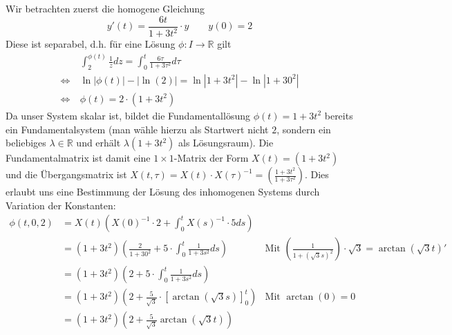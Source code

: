 \documentclass[a4paper]{article}
\begin{document}
Wir betrachten zuerst die homogene Gleichung
\begin{equation*}
    y'(t) = \frac{6t}{1 + 3t^2} \cdot y \qquad y(0) = 2
\end{equation*}
Diese ist separabel, d.h. für eine Lösung $\phi: I \to \mathds{R}$ gilt
\begin{align*}
    & \int_{2}^{\phi(t)} \frac{1}{z} dz = \int_{0}^{t} \frac{6 \tau}{1 + 3 \tau^2} d\tau \\
    \iff \ & \ln|\phi(t)| - |\ln(2)| = \ln|1 + 3 t^2| - \ln|1 + 3 0^2| \\
    \iff \ & \phi(t) = 2 \cdot  (1 + 3 t^2)
\end{align*}
Da unser System skalar ist, bildet die Fundamentallösung $\phi(t) = 1 + 3 t^2$ bereits ein Fundamentalsystem (man wähle hierzu als Startwert nicht $2$, sondern ein beliebiges $\lambda \in \mathds{R}$ und erhält $\lambda (1 + 3t^2)$ als Lösungsraum).
Die Fundamentalmatrix ist damit eine $1 \times 1$-Matrix der Form $X(t) = (1 + 3t^2)$ und die Übergangsmatrix ist $X(t, \tau) = X(t) \cdot X(\tau)^{-1} = \left( \frac{1 + 3t^2}{1 + 3 \tau^2} \right)$.
Dies erlaubt uns eine Bestimmung der Lösung des inhomogenen Systems durch Variation der Konstanten:
\begin{align*}
    \phi(t, 0, 2) &= X(t) \left( X(0)^{-1} \cdot 2 + \int_{0}^{t} X(s)^{-1} \cdot 5 ds \right) \\
    &= (1 + 3t^2) \left( \frac{2}{1 + 30^2} + 5 \cdot \int_{0}^{t} \frac{1}{1 + 3s^2} ds \right)  & \text{Mit } (\frac{1}{1 + (\sqrt{3} s)^2}) \cdot \sqrt{3} = \arctan(\sqrt{3} t)'\\
    &= (1 + 3t^2) \left( 2 + 5 \cdot \int_{0}^{t} \frac{1}{1 + 3s^2} ds \right) \\
    &= (1 + 3t^2) \left( 2 + \frac{5}{\sqrt{3}} \cdot \left[\arctan(\sqrt{3} s)\right]_0^t\right) & \text{Mit } \arctan(0) = 0\\
    &= (1 + 3t^2) \left( 2 + \frac{5}{\sqrt{3}} \arctan(\sqrt{3}t) \right)
\end{align*}
\end{document}
